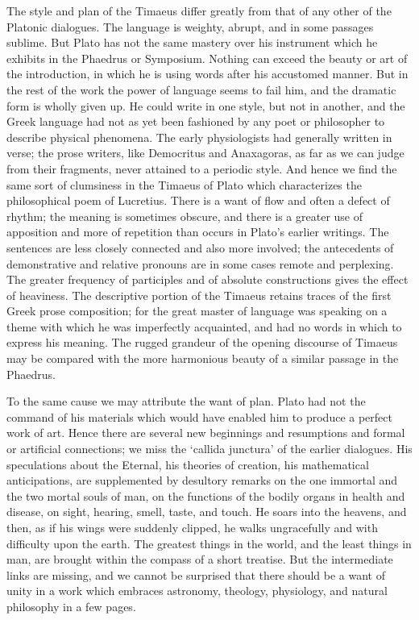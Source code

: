\documentclass[11pt,letter]{article}
\begin{document}
\par  The style and plan of the Timaeus differ greatly from that of any other of the Platonic dialogues. The language is weighty, abrupt, and in some passages sublime. But Plato has not the same mastery over his instrument which he exhibits in the Phaedrus or Symposium. Nothing can exceed the beauty or art of the introduction, in which he is using words after his accustomed manner. But in the rest of the work the power of language seems to fail him, and the dramatic form is wholly given up. He could write in one style, but not in another, and the Greek language had not as yet been fashioned by any poet or philosopher to describe physical phenomena. The early physiologists had generally written in verse; the prose writers, like Democritus and Anaxagoras, as far as we can judge from their fragments, never attained to a periodic style. And hence we find the same sort of clumsiness in the Timaeus of Plato which characterizes the philosophical poem of Lucretius. There is a want of flow and often a defect of rhythm; the meaning is sometimes obscure, and there is a greater use of apposition and more of repetition than occurs in Plato’s earlier writings. The sentences are less closely connected and also more involved; the antecedents of demonstrative and relative pronouns are in some cases remote and perplexing. The greater frequency of participles and of absolute constructions gives the effect of heaviness. The descriptive portion of the Timaeus retains traces of the first Greek prose composition; for the great master of language was speaking on a theme with which he was imperfectly acquainted, and had no words in which to express his meaning. The rugged grandeur of the opening discourse of Timaeus may be compared with the more harmonious beauty of a similar passage in the Phaedrus.

\par  To the same cause we may attribute the want of plan. Plato had not the command of his materials which would have enabled him to produce a perfect work of art. Hence there are several new beginnings and resumptions and formal or artificial connections; we miss the ‘callida junctura’ of the earlier dialogues. His speculations about the Eternal, his theories of creation, his mathematical anticipations, are supplemented by desultory remarks on the one immortal and the two mortal souls of man, on the functions of the bodily organs in health and disease, on sight, hearing, smell, taste, and touch. He soars into the heavens, and then, as if his wings were suddenly clipped, he walks ungracefully and with difficulty upon the earth. The greatest things in the world, and the least things in man, are brought within the compass of a short treatise. But the intermediate links are missing, and we cannot be surprised that there should be a want of unity in a work which embraces astronomy, theology, physiology, and natural philosophy in a few pages.
\end{document}
